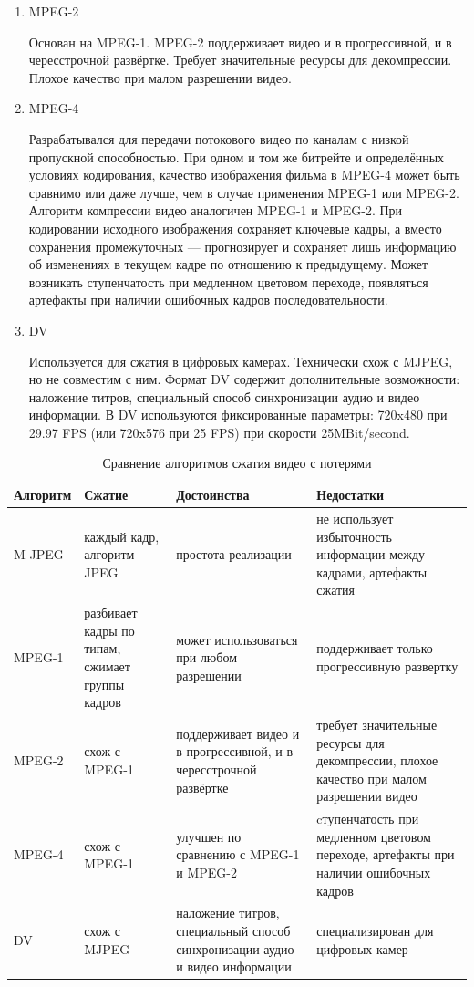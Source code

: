 \begin{itemize}
\begin{enumerate}
\item MPEG-2

Основан на MPEG-1. MPEG-2 поддерживает видео и в прогрессивной, и в чересстрочной развёртке.
Требует значительные ресурсы для декомпрессии. Плохое качество при малом разрешении видео.

\item MPEG-4

Разрабатывался для передачи потокового видео по каналам с низкой пропускной способностью. 
При одном и том же битрейте и определённых условиях кодирования, качество изображения фильма 
в MPEG-4 может быть сравнимо или даже лучше, чем в случае применения MPEG-1 или MPEG-2. 
Алгоритм компрессии видео аналогичен MPEG-1 и MPEG-2. При кодировании исходного изображения 
сохраняет ключевые кадры, а вместо сохранения промежуточных — прогнозирует и сохраняет лишь 
информацию об изменениях в текущем кадре по отношению к предыдущему. 
Может возникать ступенчатость при медленном цветовом переходе, появляться артефакты 
при наличии ошибочных кадров последовательности.

\item DV 

Используется для сжатия в цифровых камерах.
Технически схож с MJPEG, но не совместим с ним. Формат DV содержит дополнительные 
возможности: наложение титров, специальный способ 
синхронизации аудио и видео информации. 
В DV используются фиксированные параметры: 720x480 при 29.97 FPS (или 720x576 при 25 FPS) при скорости 25MBit/second.

\end{enumerate}

\begin{table}[ht]\small
  \caption{Сравнение алгоритмов сжатия видео с потерями}
  \begin{tabular}{|p{2cm}|p{3cm}|p{4.5cm}|p{4.5cm}|}
  \hline
  Алгоритм      & Сжатие & Достоинства & Недостатки \\
  \hline
  M-JPEG  & каждый кадр, алгоритм JPEG & простота реализации & не использует избыточность информации между кадрами, артефакты сжатия \\
  \hline
  MPEG-1       & разбивает кадры по типам, сжимает группы кадров & может использоваться при любом разрешении & поддерживает только прогрессивную развертку \\
  \hline
  MPEG-2   & схож с MPEG-1 & поддерживает видео и в прогрессивной, и в чересстрочной развёртке & требует значительные ресурсы для декомпрессии, плохое качество при малом разрешении видео \\
  \hline
  MPEG-4  & схож с MPEG-1 & улучшен по сравнению с MPEG-1 и MPEG-2 & cтупенчатость при медленном цветовом переходе, артефакты при наличии ошибочных кадров\\
  \hline
  DV  & схож с MJPEG & наложение титров, специальный способ синхронизации аудио и видео информации & специализирован для цифровых камер \\
  \hline
  \end{tabular}
  \label{tab:t2}
\end{table}


\end{itemize}

